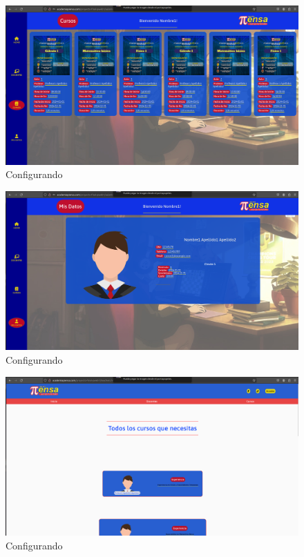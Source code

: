 \begin{figure}[H]
  \centering
  \includegraphics[width=1.0\textwidth]{img/AulaVirtual3.png}
  \caption{Configurando}
\end{figure}
\begin{figure}[H]
  \centering
  \includegraphics[width=1.0\textwidth]{img/AulaVirtual4.png}
  \caption{Configurando}
\end{figure}
\begin{figure}[H]
  \centering
  \includegraphics[width=1.0\textwidth]{img/Profesores.png}
  \caption{Configurando}
\end{figure}
